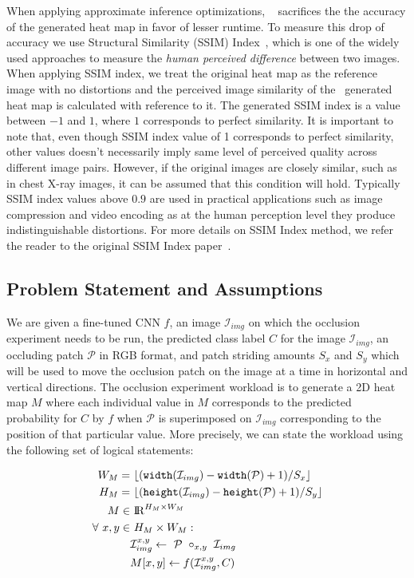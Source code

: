 When applying approximate inference optimizations, \system~ sacrifices the the accuracy of the generated heat map in favor of lesser runtime.
To measure this drop of accuracy we use Structural Similarity (SSIM) Index~\cite{wang2004image}, which is one of the widely used approaches to measure the \textit{human perceived difference} between two images.
When applying SSIM index, we treat the original heat map as the reference image with no distortions and the perceived image similarity of the \system~generated heat map is calculated with reference to it.
The generated SSIM index is a value between $-1$ and $1$, where $1$ corresponds to perfect similarity.
It is important to note that, even though SSIM index value of 1 corresponds to perfect similarity, other values doesn't necessarily imply same level of perceived quality across different image pairs.
However, if the original images are closely similar, such as in chest X-ray images, it can be assumed that this condition will hold.
Typically SSIM index values above $0.9$ are used in practical applications such as image compression and video encoding as at the human perception level they produce indistinguishable distortions.
For more details on SSIM Index method, we refer the reader to the original SSIM Index paper~\cite{wang2004image}.


\subsection{Problem Statement and Assumptions}

We are given a fine-tuned CNN $f$, an image $\mathcal{I}_{img}$ on which the occlusion experiment needs to be run, the predicted class label $C$ for the image $\mathcal{I}_{img}$, an occluding patch $\mathcal{P}$ in RGB format, and patch striding amounts $S_{x}$ and $S_{y}$ which will be used to move the occlusion patch on the image at a time in horizontal and vertical directions. The occlusion experiment workload is to generate a 2D heat map $M$ where each individual value in $M$ corresponds to the predicted probability for $C$ by $f$ when $\mathcal{P}$ is superimposed on $\mathcal{I}_{img}$ corresponding to the position of that particular value. More precisely, we can state the workload using the following set of logical statements:


\begin{align}
\label{eqn:mheight}
W_M =&~ \lfloor(\texttt{width}(\mathcal{I}_{img}) - \texttt{width}(\mathcal{P}) + 1)/S_{x}\rfloor\\
\label{eqn:mwidth}
H_M =&~ \lfloor(\texttt{height}(\mathcal{I}_{img}) - \texttt{height}(\mathcal{P}) + 1)/S_{y}\rfloor\\
M \in&~ \mathcal{\rm I\!R}^{H_M \times W_M}\\
\forall~ x,y \in&~ H_M \times W_M:\\
\label{eqn:patchimpose}
& \mathcal{I}_{img}^{x,y} \leftarrow ~\mathcal{P} ~\circ_{x,y} ~ \mathcal{I}_{img}\\
\label{eqn:outputval}
& M[x,y] \leftarrow f(\mathcal{I}_{img}^{x,y},C)
\end{align}

